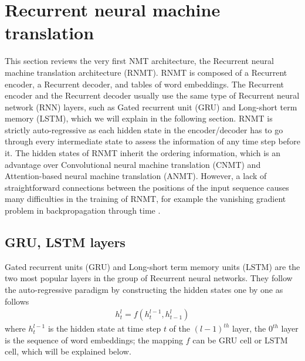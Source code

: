 \section{Recurrent neural machine translation} \label{sec:rrn}
This section reviews the very first NMT architecture, the Recurrent neural machine translation architecture (RNMT). RNMT is composed of a Recurrent encoder, a Recurrent decoder, and tables of word embeddings. The Recurrent encoder and the Recurrent decoder usually use the same type of Recurrent neural network (RNN) layers, such as Gated recurrent unit (GRU) and Long-short term memory (LSTM), which we will explain in the following section. RNMT is strictly auto-regressive as each hidden state in the encoder/decoder has to go through every intermediate state to assess the information of any time step before it. The hidden states of RNMT inherit the ordering information, which is an advantage over Convolutional neural machine translation (CNMT) and Attention-based neural machine translation (ANMT). However, a lack of straightforward connections between the positions of the input sequence causes many difficulties in the training of RNMT, for example the vanishing gradient problem in backpropagation through time \citet{Pascanu13onthe}.

\subsection{GRU, LSTM layers}
Gated recurrent units (GRU) and Long-short term memory units (LSTM) are the two most popular layers in the group of Recurrent neural networks. They follow the auto-regressive paradigm by constructing the hidden states one by one as follows
\begin{equation}
\begin{array}{rcl}
h^l_t = f(h^{l-1}_t, h^l_{t-1})
\end{array}
\end{equation}
where $h^{l-1}_t$ is the hidden state at time step $t$ of the $(l-1)^{th}$ layer, the $0^{th}$ layer is the sequence of word embeddings; the mapping $f$ can be GRU cell or LSTM cell, which will be explained below.

